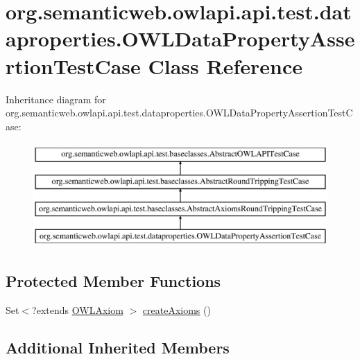 \hypertarget{classorg_1_1semanticweb_1_1owlapi_1_1api_1_1test_1_1dataproperties_1_1_o_w_l_data_property_assertion_test_case}{\section{org.\-semanticweb.\-owlapi.\-api.\-test.\-dataproperties.\-O\-W\-L\-Data\-Property\-Assertion\-Test\-Case Class Reference}
\label{classorg_1_1semanticweb_1_1owlapi_1_1api_1_1test_1_1dataproperties_1_1_o_w_l_data_property_assertion_test_case}
}
Inheritance diagram for org.\-semanticweb.\-owlapi.\-api.\-test.\-dataproperties.\-O\-W\-L\-Data\-Property\-Assertion\-Test\-Case\-:\begin{figure}[H]
\begin{center}
\leavevmode
\includegraphics[height=4.000000cm]{classorg_1_1semanticweb_1_1owlapi_1_1api_1_1test_1_1dataproperties_1_1_o_w_l_data_property_assertion_test_case}
\end{center}
\end{figure}
\subsection*{Protected Member Functions}
\begin{DoxyCompactItemize}
\item 
Set$<$?extends \hyperlink{interfaceorg_1_1semanticweb_1_1owlapi_1_1model_1_1_o_w_l_axiom}{O\-W\-L\-Axiom} $>$ \hyperlink{classorg_1_1semanticweb_1_1owlapi_1_1api_1_1test_1_1dataproperties_1_1_o_w_l_data_property_assertion_test_case_a263975d2a1fcabe2511f776b415ede6f}{create\-Axioms} ()
\end{DoxyCompactItemize}
\subsection*{Additional Inherited Members}


